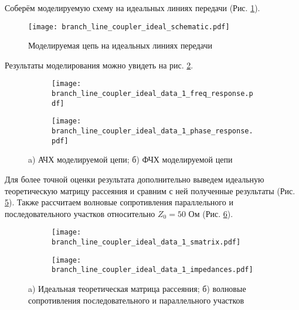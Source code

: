 Соберём моделируемую схему на идеальных линиях передачи (Рис. \ref{fig:branch_line_coupler_ideal_schematic}).

\begin{figure}[!ht]
    \centering
    \texttt{[image: branch\_line\_coupler\_ideal\_schematic.pdf]}
    \caption{Моделируемая цепь на идеальных линиях передачи}
    \label{fig:branch_line_coupler_ideal_schematic}
\end{figure}

Результаты моделирования можно увидеть на рис. \ref{fig:branch_line_coupler_ideal_data_1_freq_response}.

\begin{figure}[!ht]
    \centering
    \begin{subfigure}[b]{0.45\textwidth}
        \centering
        \texttt{[image: branch\_line\_coupler\_ideal\_data\_1\_freq\_response.pdf]}
        \caption{}
        \label{fig:branch_line_coupler_ideal_data_1_freq_response}
    \end{subfigure}
    \hfill
    \begin{subfigure}[b]{0.45\textwidth}
        \centering
        \texttt{[image: branch\_line\_coupler\_ideal\_data\_1\_phase\_response.pdf]}
        \caption{}
        \label{fig:branch_line_coupler_ideal_data_1_phase_response}
    \end{subfigure}
    \caption{
        a) АЧХ моделируемой цепи;
        б) ФЧХ моделируемой цепи
    }
    \label{fig:branch_line_coupler_ideal_data_display_1}
\end{figure}

Для более точной оценки результата дополнительно выведем идеальную теоретическую матрицу рассеяния и сравним с ней полученные результаты (Рис. \ref{fig:branch_line_coupler_ideal_data_1_smatrix}).
Также рассчитаем волновые сопротивления параллельного и последовательного участков относительно $Z_0 = 50 \text{~Ом}$ (Рис. \ref{fig:branch_line_coupler_ideal_data_1_impedances}).

\begin{figure}[!ht]
    \centering
    \begin{subfigure}[b]{0.7\textwidth}
        \centering
        \texttt{[image: branch\_line\_coupler\_ideal\_data\_1\_smatrix.pdf]}
        \caption{}
        \label{fig:branch_line_coupler_ideal_data_1_smatrix}
    \end{subfigure}

    \begin{subfigure}[b]{0.7\textwidth}
        \centering
        \texttt{[image: branch\_line\_coupler\_ideal\_data\_1\_impedances.pdf]}
        \caption{}
        \label{fig:branch_line_coupler_ideal_data_1_impedances}
    \end{subfigure}
    \caption{
        a) Идеальная теоретическая матрица рассеяния;
        б) волновые сопротивления последовательного и параллельного участков
    }
    \label{fig:branch_line_coupler_ideal_data_display_2}
\end{figure}

